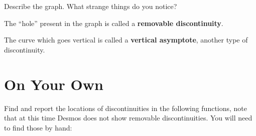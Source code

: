 \documentclass{ximera}
\begin{document}
\begin{question}
Describe the graph. What strange things do you notice?
\begin{freeResponse}
\end{freeResponse}
\end{question}
The ``hole'' present in the graph is called a \textbf{removable discontinuity}.

The curve which goes vertical is called a \textbf{vertical asymptote}, another type of discontinuity.

\section{On Your Own}

Find and report the locations of discontinuities in the following functions, note that at this time Desmos does not show removable discontinuities. You will need to find those by hand:
\end{document}
